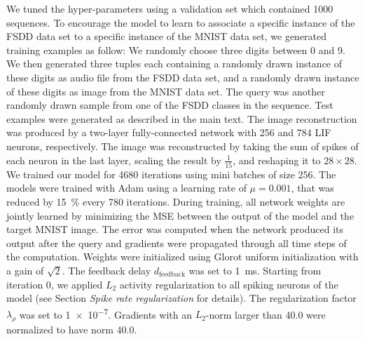\documentclass{article}
\begin{document}
We tuned the hyper-parameters using a validation set which contained \num{1000} sequences. To encourage the model to learn to associate a specific instance of the FSDD data set to a specific instance of the MNIST data set, we generated training examples as follow: We randomly choose three digits between \num{0} and \num{9}. We then generated three tuples each containing a randomly drawn instance of these digits as audio file from the FSDD data set, and a randomly drawn instance of these digits as image from the MNIST data set. The query was another randomly drawn sample from one of the FSDD classes in the sequence. Test examples were generated as described in the main text. 
The image reconstruction was produced by a two-layer fully-connected network with \num{256} and \num{784} \gls{LIF} neurons, respectively. The image was reconstructed by taking the sum of spikes of each neuron in the last layer, scaling the result by $\frac{1}{15}$, and reshaping it to $28 \times 28$. 
We trained our model for \num{4680} iterations using mini batches of size \num{256}. The models were trained with Adam \cite{kingma2014adam} using a learning rate of $\mu = 0.001$, that was reduced by \SI{15}{\percent} every \num{780} iterations. During training, all network weights are jointly learned by minimizing the \gls{MSE} between the output of the model and the target MNIST image. The error was computed when the network produced its output after the query and gradients were propagated through all time steps of the computation. Weights were initialized using Glorot uniform initialization \cite{glorot2010understanding} with a gain of $\sqrt{2}$. The feedback delay $d_{\mathrm{feedback}}$ was set to \SI{1}{ms}. Starting from iteration \num{0}, we applied $L_2$ activity regularization to all spiking neurons of the model (see Section \emph{Spike rate regularization} for details). The regularization factor $\lambda_{\rho}$ was set to \num{1e-7}. Gradients with an $L_2$-norm larger than \num{40.0} were normalized to have norm \num{40.0}.
\end{document}
